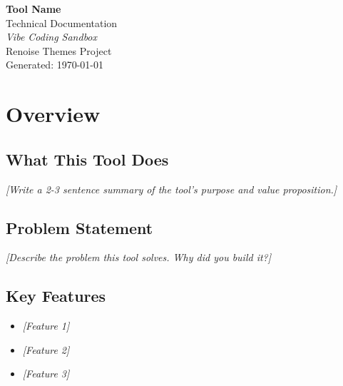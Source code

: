 \documentclass[11pt,a4paper]{report}
\begin{document}
\begin{titlepage}
    \centering
    \vspace*{3cm}
    {\Huge\bfseries Tool Name\\[0.5cm]}
    {\Large Technical Documentation\\[2cm]}
    {\large\itshape Vibe Coding Sandbox\\[0.3cm]}
    {\large Renoise Themes Project\\[3cm]}
    \vfill
    {\large Generated: \today}
\end{titlepage}

\tableofcontents
\newpage

\chapter{Overview}

\section{What This Tool Does}
\textit{[Write a 2-3 sentence summary of the tool's purpose and value proposition.]}

\section{Problem Statement}
\textit{[Describe the problem this tool solves. Why did you build it?]}

\section{Key Features}
\begin{itemize}[leftmargin=2em]
    \item \textit{[Feature 1]}
    \item \textit{[Feature 2]}
    \item \textit{[Feature 3]}
\end{itemize}

\end{document}
